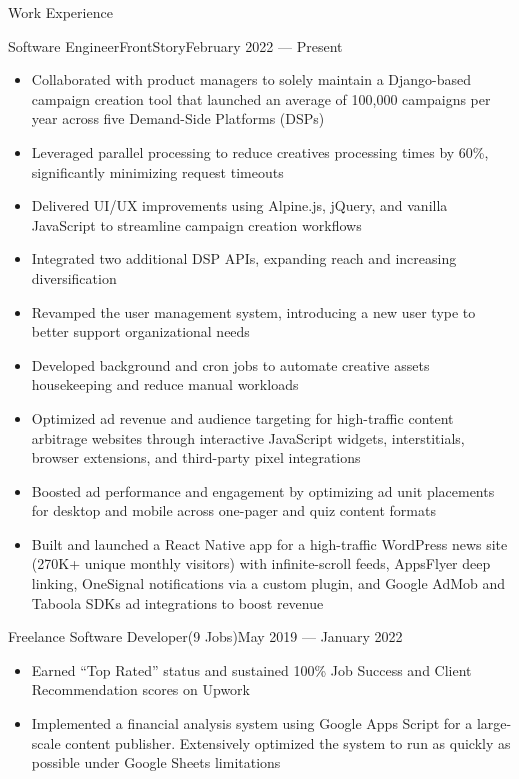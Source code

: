 \documentclass[]{mcdowellcv}
\begin{document}
	\makeheader
	
	
	\begin{cvsection}{Work Experience}
		\begin{cvsubsection}{Software Engineer}{FrontStory}{February 2022 — Present}
			\begin{itemize}
				\item Collaborated with product managers to solely maintain a Django-based campaign creation tool that launched an average of 100,000 campaigns per year across five Demand-Side Platforms (DSPs)
				\item Leveraged parallel processing to reduce creatives processing times by 60\%, significantly minimizing request timeouts
				\item Delivered UI/UX improvements using Alpine.js, jQuery, and vanilla JavaScript to streamline campaign creation workflows
				\item Integrated two additional DSP APIs, expanding reach and increasing diversification
				\item Revamped the user management system, introducing a new user type to better support organizational needs
				\item Developed background and cron jobs to automate creative assets housekeeping and reduce manual workloads
				\item Optimized ad revenue and audience targeting for high-traffic content arbitrage websites through interactive JavaScript widgets, interstitials, browser extensions, and third-party pixel integrations
				\item Boosted ad performance and engagement by optimizing ad unit placements for desktop and mobile across one-pager and quiz content formats
				\item Built and launched a React Native app for a high-traffic WordPress news site (270K+ unique monthly visitors) with infinite-scroll feeds, AppsFlyer deep linking, OneSignal notifications via a custom plugin, and Google AdMob and Taboola SDKs ad integrations to boost revenue
			\end{itemize}
		\end{cvsubsection}
		\begin{cvsubsection}{Freelance Software Developer}{(9 Jobs)}{May 2019 — January 2022}
			\begin{itemize}
				\item Earned “Top Rated” status and sustained 100\% Job Success and Client Recommendation scores on Upwork
				\item Implemented a financial analysis system using Google Apps Script for a large-scale content publisher. Extensively optimized the system to run as quickly as possible under Google Sheets limitations
			\end{itemize}
		\end{cvsubsection}
	\end{cvsection}
	
\end{document}
